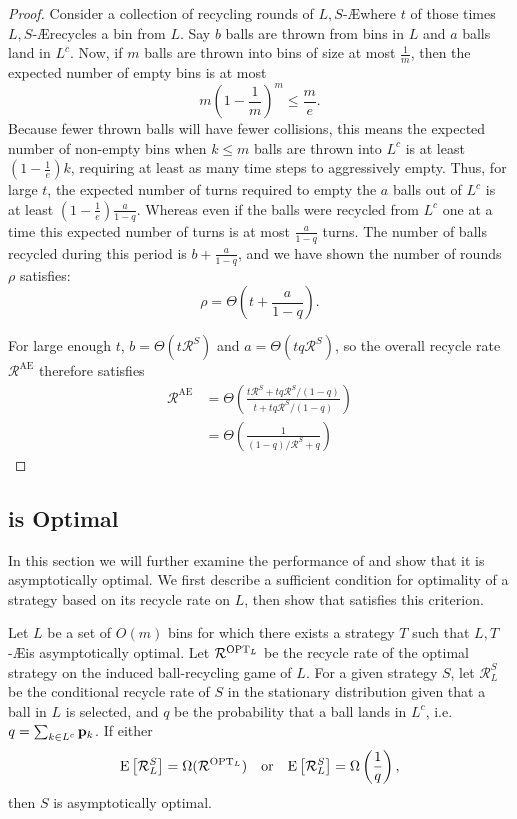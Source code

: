 \begin{proof}
	Consider a collection of recycling rounds of $L,S$-\AE where $t$ of those
	times $L,S$-\AE recycles a bin from $L$. Say $b$ balls are thrown from bins
	in $L$ and $a$ balls land in $L^c$. Now, if $m$ balls are thrown into bins
	of size at most $\frac{1}{m}$, then the expected number of empty bins is at
	most \[ m \left(1 - \frac{1}{m}\right)^m \leq \frac{m}{e}.\] Because fewer
	thrown balls will have fewer collisions, this means the expected number of
	non-empty bins when $k \leq m$ balls are thrown into $L^c$ is at least
	$\left(1-\frac{1}{e}\right)k$, requiring at least as many time steps to
	aggressively empty. Thus, for large $t$, the expected number of turns
	required to empty the $a$ balls out of $L^c$ is at least
	$\left(1-\frac{1}{e}\right)\frac{a}{1-q}$. Whereas even if the balls were
	recycled from $L^c$ one at a time this expected number of turns is at most
	$\frac{a}{1 - q}$ turns. The number of balls recycled during this period is
	$b + \frac{a}{1 - q}$, and we have shown the number of rounds $\rho$
	satisfies: \[\rho = \Theta\left(t + \frac{a}{1-q}\right).\]

	For large enough $t$, $b = \Theta\left(t\mathcal{R}^S\right)$ and
	$a = \Theta\left(tq\mathcal{R}^S\right)$, so the overall recycle rate
	$\mathcal{R}^\textrm{AE}$ therefore satisfies
	\begin{align*}
		\mathcal{R}^\textrm{AE} &= \Theta\left(\frac{t\mathcal{R}^S + tq\mathcal{R}^S/(1 - q)}{t + tq\mathcal{R}^S/(1 - q)}\right) \\
		&= \Theta\left(\frac{1}{(1 - q)/\mathcal{R}^S + q}\right)
	\end{align*}
\end{proof}

\subsection{\RB is Optimal}\label{sec:br-rboptproof}

In this section we will further examine the performance of \RB and show that it
is asymptotically optimal. We first describe a sufficient condition for
optimality of a strategy based on its recycle rate on $L$, then show that \RB
satisfies this criterion.

\begin{lemma}\label{lem:rl-opt}
	Let $L$ be a set of $O(m)$ bins for which there exists a strategy $T$ such
	that $L,T$-\AE is asymptotically optimal.  Let $\mathcal{R}^{\textrm{OPT}_L}$ be
	the recycle rate of the optimal strategy on the induced ball-recycling game
	of $L$.  For a given strategy $S$, let $\mathcal{R}_L^S$ be the conditional
	recycle rate of $S$ in the stationary distribution given that a ball in $L$
	is selected, and $q$ be the probability that a ball lands in $L^c$, i.e. $q
	= \sum_{k \in L^c} \mathbf{p}_k$. If either
	\[ \mathrm{E}\left[\mathcal{R}_L^S\right] = \Omega(\mathcal{R}^{\textrm{OPT}_L})
	\quad\textrm{or}\quad\mathrm{E}\left[\mathcal{R}_L^S\right] =
	\Omega\left(\frac{1}{q}\right),\]
	then $S$ is asymptotically optimal.
\end{lemma}

